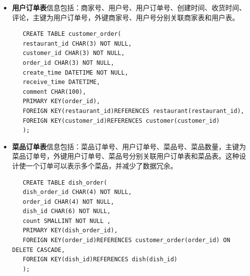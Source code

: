 \documentclass[12pt, oneside,a4paper]{article}
\begin{document}
\begin{itemize}
\begin{lstlisting}
   );
      \end{lstlisting}
 \item \textbf{用户订单表}信息包括：商家号、用户号、用户订单号、创建时间、收货时间、评论，主键为用户订单号，外键商家号、用户号分别关联商家表和用户表。
     \begin{lstlisting}
   CREATE TABLE customer_order(
   restaurant_id CHAR(3) NOT NULL,
   customer_id CHAR(3) NOT NULL,
   order_id CHAR(3) NOT NULL,
   create_time DATETIME NOT NULL,
   receive_time DATETIME,
   comment CHAR(100),
   PRIMARY KEY(order_id),
   FOREIGN KEY(restaurant_id)REFERENCES restaurant(restaurant_id),
   FOREIGN KEY(customer_id)REFERENCES customer(customer_id)
   );
      \end{lstlisting}
 \item \textbf{菜品订单表}信息包括：菜品订单号、用户订单号、菜品号、菜品数量，主键为菜品订单号，外键用户订单号、菜品号分别关联用户订单表和菜品表。这种设计使一个订单可以表示多个菜品，并减少了数据冗余。
     \begin{lstlisting}
   CREATE TABLE dish_order(
   dish_order_id CHAR(4) NOT NULL,
   order_id CHAR(4) NOT NULL,
   dish_id CHAR(6) NOT NULL,
   count SMALLINT NOT NULL ,
   PRIMARY KEY(dish_order_id),
   FOREIGN KEY(order_id)REFERENCES customer_order(order_id) ON DELETE CASCADE,
   FOREIGN KEY(dish_id)REFERENCES dish(dish_id)
   );
      \end{lstlisting}
 \end{itemize}
\end{document}
